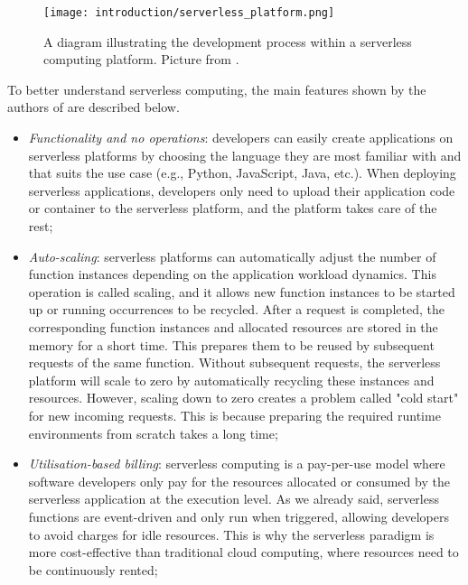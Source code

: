 \documentclass[../thesis.tex]{subfiles}
\begin{document}
\begin{figure}[H]
    \centering
    \texttt{[image: introduction/serverless\_platform.png]}
    \caption[Development process within a serverless platform]{A diagram illustrating the development process within a serverless computing platform. Picture from \cite{article:review_serverless_2023}.}
    \label{fig:serverless_platform}
\end{figure}

To better understand serverless computing, the main features shown by the authors of  \cite{article:review_serverless_2023} are described below.
\begin{itemize}
    \item \textit{Functionality and no operations}: developers can easily create applications on serverless platforms by choosing the language they are most familiar with and that suits the use case (e.g., Python, JavaScript, Java, etc.). When deploying serverless applications, developers only need to upload their application code or \gls{container} to the serverless platform, and the platform takes care of the rest;
    \item \textit{Auto-scaling}: serverless platforms can automatically adjust the number of function instances depending on the application workload dynamics. This operation is called scaling, and it allows new function instances to be started up or running occurrences to be recycled. After a request is completed, the corresponding function instances and allocated resources are stored in the memory for a short time. This prepares them to be reused by subsequent requests of the same function. Without subsequent requests, the serverless platform will scale to zero by automatically recycling these instances and resources. However, scaling down to zero creates a problem called "cold start" for new incoming requests. This is because preparing the required runtime environments from scratch takes a long time;
    \item \textit{Utilisation-based billing}: serverless computing is a pay-per-use model where software developers only pay for the resources allocated or consumed by the serverless application at the execution level. As we already said, serverless functions are event-driven and only run when triggered, allowing developers to avoid charges for idle resources. This is why the serverless paradigm is more cost-effective than traditional cloud computing, where resources need to be continuously rented;

\end{itemize}
\end{document}
